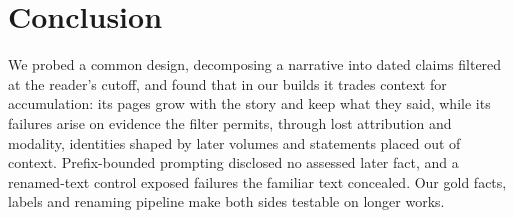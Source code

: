 \section{Conclusion}
\label{sec:conclusion}

We probed a common design, decomposing a narrative into dated claims filtered at the
reader's cutoff, and found that in our builds it trades context for accumulation: its pages
grow with the story and keep what they said, while its failures arise on evidence the
filter permits, through lost attribution and modality, identities shaped by later volumes
and statements placed out of context. Prefix-bounded prompting
disclosed no assessed later fact, and a renamed-text control exposed failures the familiar
text concealed. Our gold facts, labels and renaming pipeline make both sides testable on
longer works.
